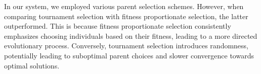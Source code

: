 In our system, we employed various parent selection schemes. However, when comparing tournament selection with fitness proportionate selection, the latter outperformed. This is because fitness proportionate selection consistently emphasizes choosing individuals based on their fitness, leading to a more directed evolutionary process. Conversely, tournament selection introduces randomness, potentially leading to suboptimal parent choices and slower convergence towards optimal solutions.


